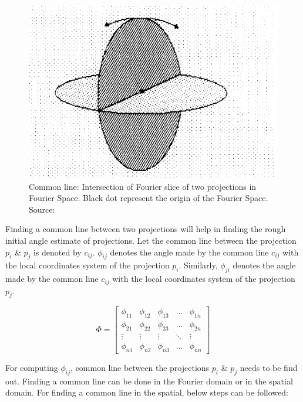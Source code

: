 \documentclass[twoside]{iitbreport}
\begin{document}
\begin{figure}[h]
\includegraphics[width=0.7\linewidth]{3dr_plane_intersection.png}
\centering
\captionsetup{justification=centering}
\caption{Common line: Intersection of Fourier slice of two projections in Fourier Space. Black dot represent the origin of the Fourier Space. Source:  \cite{van1987angular} }
\label{fig: 3dr_plane_intersection}
\end{figure}

Finding a common line between two projections will help in finding the rough initial angle estimate of projections. Let the common line between the projection ${p_i}$ \& ${p_j}$ is denoted by ${c_{ij}}$. ${\phi_{ij}}$ denotes the angle made by the common line ${c_{ij}}$ with the local coordinates system of the projection ${p_i}$. Similarly, ${\phi_{ji}}$ denotes the angle made by the common line ${c_{ij}}$ with the local coordinates system of the projection ${p_j}$. 

\[\label{eq:commonline_phi}
\Phi
=
\begin{bmatrix}
    \phi_{11} & \phi_{12} & \phi_{13} & \dots  & \phi_{1n} \\
    \phi_{21} & \phi_{22} & \phi_{23} & \dots  & \phi_{2n} \\
    \vdots & \vdots & \vdots & \ddots & \vdots \\
    \phi_{n1} & \phi_{n2} & \phi_{n3} & \dots  & \phi_{nn}
\end{bmatrix}
\]

For computing ${\phi_{ij}}$, common line between the projections  ${p_i}$ \& ${p_j}$ needs to be find out. Finding a common line can be done in the Fourier domain or in the spatial domain. For finding a common line in the spatial, below steps can be followed:
\end{document}
